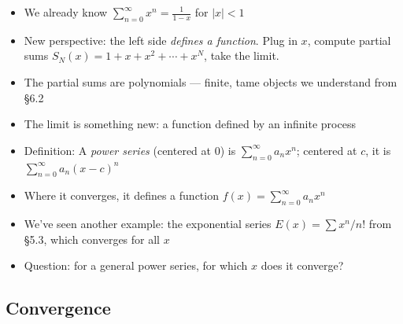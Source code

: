 \documentclass[
  10pt,
  letterpaper,
]{scrbook}
\providecommand{\tightlist}{%
  \setlength{\itemsep}{0pt}\setlength{\parskip}{0pt}}
\begin{document}
\begin{itemize}
\tightlist
\item
  We already know \(\sum_{n=0}^{\infty} x^n = \frac{1}{1-x}\) for
  \(|x| < 1\)
\item
  New perspective: the left side \emph{defines a function}. Plug in
  \(x\), compute partial sums \(S_N(x) = 1 + x + x^2 + \cdots + x^N\),
  take the limit.
\item
  The partial sums are polynomials --- finite, tame objects we
  understand from §6.2
\item
  The limit is something new: a function defined by an infinite process
\item
  Definition: A \emph{power series} (centered at \(0\)) is
  \(\sum_{n=0}^{\infty} a_n x^n\); centered at \(c\), it is
  \(\sum_{n=0}^{\infty} a_n (x - c)^n\)
\item
  Where it converges, it defines a function
  \(f(x) = \sum_{n=0}^{\infty} a_n x^n\)
\item
  We've seen another example: the exponential series
  \(E(x) = \sum x^n/n!\) from §5.3, which converges for all \(x\)
\item
  Question: for a general power series, for which \(x\) does it
  converge?
\end{itemize}

\subsection{Convergence}\label{convergence-2}
\end{document}

